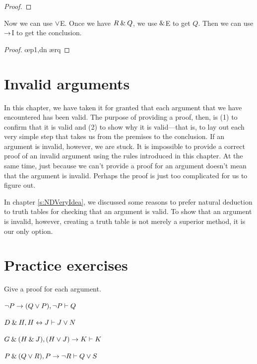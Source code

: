 \begin{proof}
	 \pr{}	
	\open
		\as{}
		 
\end{proof}
Now we can use $\vee$E. Once we have $R \mathbin{\&} Q$, we use $\mathbin{\&}$E to get $Q$. Then we  can use $\rightarrow$I to get the conclusion.

\begin{proof}
	 \pr{}	
	\open
		\as{}
		 
		 \oe{p1,dn}
		 \ae{rq}
	\close
\end{proof}



\section{Invalid arguments}

In this chapter, we have taken it for granted that each argument that we have encountered has been valid. The purpose of providing a proof, then, is (1) to confirm that it is valid and (2) to show why it is valid---that is, to lay out each very simple step that takes us from the premises to the conclusion. If an argument is invalid, however, we are stuck. It is impossible to provide a correct proof of an invalid argument using the rules introduced in this chapter. At the same time, just because we can't provide a proof for an argument doesn't mean that the argument is invalid. Perhaps the proof is just too complicated for us to figure out. 

In chapter \ref{s:NDVeryIdea}, we discussed some reasons to prefer natural deduction to truth tables for checking that an argument is valid. To show that an argument is invalid, however, creating a truth table is not merely a superior method, it is our only option.



\section{Practice exercises}
\setcounter{ProbPart}{0}

\problempart
Give a proof for each argument.
\begin{earg}
\item ${\neg} P \rightarrow (Q \vee P), {\neg} P \vdash Q$\smallskip
\item $D \mathbin{\&} H, H \leftrightarrow J  \vdash J \vee N$\smallskip 
\item $G \mathbin{\&} (H \mathbin{\&} J), (H \vee J) \rightarrow K \vdash K$\smallskip
\item $P \mathbin{\&} (Q \vee R), P \rightarrow {\neg} R \vdash Q \vee S$\smallskip
\end{earg}


